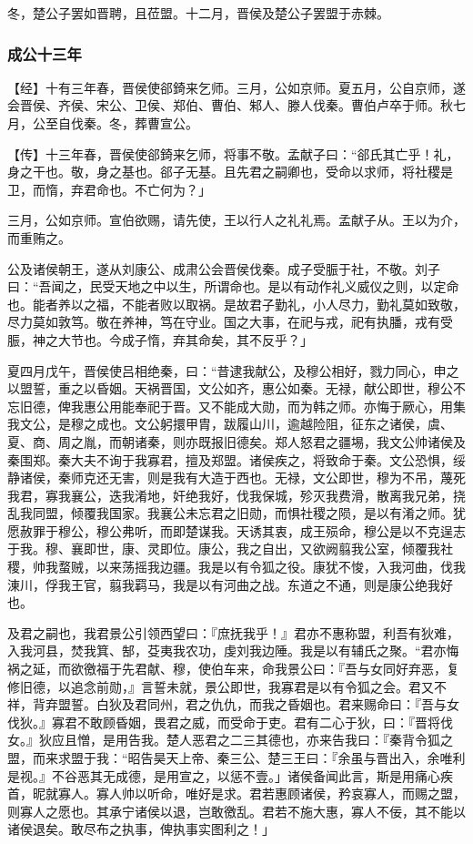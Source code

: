 \documentclass[]{article}
\begin{document}
冬，楚公子罢如晋聘，且莅盟。十二月，晋侯及楚公子罢盟于赤棘。

\hypertarget{header-n1692}{%
\subsubsection{成公十三年 }\label{header-n1692}}

【经】十有三年春，晋侯使郤錡来乞师。三月，公如京师。夏五月，公自京师，遂会晋侯、齐侯、宋公、卫侯、郑伯、曹伯、邾人、滕人伐秦。曹伯卢卒于师。秋七月，公至自伐秦。冬，葬曹宣公。

【传】十三年春，晋侯使郤錡来乞师，将事不敬。孟献子曰：``郤氏其亡乎！礼，身之干也。敬，身之基也。郤子无基。且先君之嗣卿也，受命以求师，将社稷是卫，而惰，弃君命也。不亡何为？」

三月，公如京师。宣伯欲赐，请先使，王以行人之礼礼焉。孟献子从。王以为介，而重贿之。

公及诸侯朝王，遂从刘康公、成肃公会晋侯伐秦。成子受脤于社，不敬。刘子曰：``吾闻之，民受天地之中以生，所谓命也。是以有动作礼义威仪之则，以定命也。能者养以之福，不能者败以取祸。是故君子勤礼，小人尽力，勤礼莫如致敬，尽力莫如敦笃。敬在养神，笃在守业。国之大事，在祀与戎，祀有执膰，戎有受脤，神之大节也。今成子惰，弃其命矣，其不反乎？」

夏四月戊午，晋侯使吕相绝秦，曰：``昔逮我献公，及穆公相好，戮力同心，申之以盟誓，重之以昏姻。天祸晋国，文公如齐，惠公如秦。无禄，献公即世，穆公不忘旧德，俾我惠公用能奉祀于晋。又不能成大勋，而为韩之师。亦悔于厥心，用集我文公，是穆之成也。文公躬擐甲胄，跋履山川，逾越险阻，征东之诸侯，虞、夏、商、周之胤，而朝诸秦，则亦既报旧德矣。郑人怒君之疆埸，我文公帅诸侯及秦围郑。秦大夫不询于我寡君，擅及郑盟。诸侯疾之，将致命于秦。文公恐惧，绥静诸侯，秦师克还无害，则是我有大造于西也。无禄，文公即世，穆为不吊，蔑死我君，寡我襄公，迭我淆地，奸绝我好，伐我保城，殄灭我费滑，散离我兄弟，挠乱我同盟，倾覆我国家。我襄公未忘君之旧勋，而惧社稷之陨，是以有淆之师。犹愿赦罪于穆公，穆公弗听，而即楚谋我。天诱其衷，成王殒命，穆公是以不克逞志于我。穆、襄即世，康、灵即位。康公，我之自出，又欲阙翦我公室，倾覆我社稷，帅我蝥贼，以来荡摇我边疆。我是以有令狐之役。康犹不悛，入我河曲，伐我涷川，俘我王官，翦我羁马，我是以有河曲之战。东道之不通，则是康公绝我好也。

及君之嗣也，我君景公引领西望曰：『庶抚我乎！』君亦不惠称盟，利吾有狄难，入我河县，焚我箕、郜，芟夷我农功，虔刘我边陲。我是以有辅氏之聚。``君亦悔祸之延，而欲徼福于先君献、穆，使伯车来，命我景公曰：『吾与女同好弃恶，复修旧德，以追念前勋，』言誓未就，景公即世，我寡君是以有令狐之会。君又不祥，背弃盟誓。白狄及君同州，君之仇仇，而我之昏姻也。君来赐命曰：『吾与女伐狄。』寡君不敢顾昏姻，畏君之威，而受命于吏。君有二心于狄，曰：『晋将伐女。』狄应且憎，是用告我。楚人恶君之二三其德也，亦来告我曰：『秦背令狐之盟，而来求盟于我：``昭告昊天上帝、秦三公、楚三王曰：『余虽与晋出入，余唯利是视。』不谷恶其无成德，是用宣之，以惩不壹。」诸侯备闻此言，斯是用痛心疾首，昵就寡人。寡人帅以听命，唯好是求。君若惠顾诸侯，矜哀寡人，而赐之盟，则寡人之愿也。其承宁诸侯以退，岂敢徼乱。君若不施大惠，寡人不佞，其不能以诸侯退矣。敢尽布之执事，俾执事实图利之！」
\end{document}
